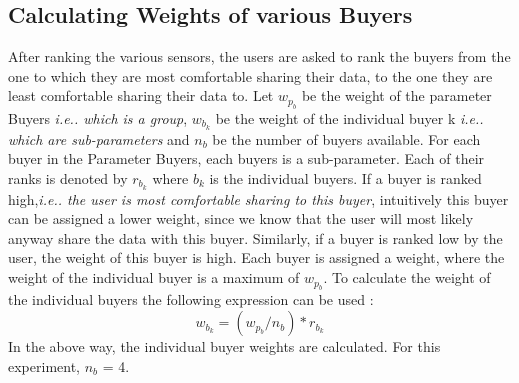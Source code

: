 \subsection{Calculating Weights of various Buyers}
After ranking the various sensors, the users are asked to rank the buyers from the one to which they are most comfortable sharing their data,
to the one they are least comfortable sharing their data to. Let $w_{p_{b}}$ be the weight of the parameter Buyers {\it i.e.. which is a group}, $w_{b_{k}}$ be the weight of
the individual buyer k {\it i.e.. which are sub-parameters} and $n_b$ be the number of buyers available. For each buyer in the Parameter Buyers, each buyers is a sub-parameter.
Each of their ranks is denoted by $r_{b_{k}}$ where $b_k$ is the individual buyers.  If a buyer is ranked high,{\it i.e.. the user is most comfortable sharing to this buyer}, intuitively this buyer can be assigned a lower weight,
since we know that the user will most likely anyway share the data with this buyer. Similarly, if a buyer is ranked low by the user, the weight of this buyer is high.
Each buyer is assigned a weight, where the weight of the individual
buyer is a maximum of $w_{p_{b}}$. To calculate the weight of the individual buyers the following expression can be used :
$$w_{b_{k}} = (w_{p_{b}}/n_b)*r_{b_{k}}$$
In the above way, the individual buyer weights are calculated. For this experiment, $n_b$ = 4.





